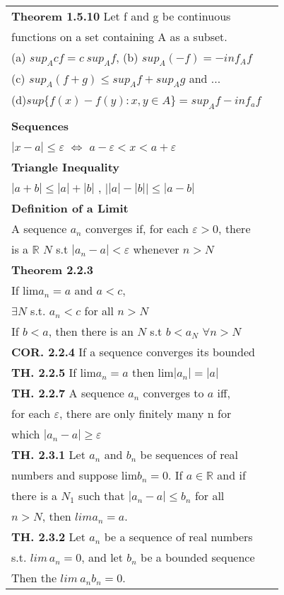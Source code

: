 \documentclass[10 pt,landscape]{article}
\begin{document}
\begin{multicols}{4}
\begin{tabular}{@{}ll@{}}
\textbf{Theorem 1.5.10} Let f and g be continuous\\ functions on a set containing A as a subset.\\
(a) $sup_A cf = c\:sup_A f$, 
(b) $sup_A(-f)=-inf_Af$\\
(c) $sup_A(f+g)\leq sup_Af + sup_Ag$ and ...\\
(d)$sup\{f(x)-f(y):x,y\in A\} = sup_Af-inf_af$
\\
\\
\textbf{Sequences}\\
$|x-a| \le \varepsilon$ $\iff$ $a-\varepsilon <x<a+ \varepsilon$\\
\textbf{Triangle Inequality}\\
$|a+b|\leq |a|+|b|$ , $\lvert |a|-|b|\rvert \leq |a-b|$\\
\textbf{Definition of a Limit}\\
A sequence $a_n$ converges if, for each  $\varepsilon >0$, there \\ is a $\mathbb{R}$ $N$ s.t 
$|a_n-a|<\varepsilon $ whenever $n>N$\\
\textbf{Theorem 2.2.3} \\
If lim\:$a_n =a$ and $a<c,$ \\ $\exists N$ s.t. $a_n<c$ for all $n>N$\\
If $b<a$, then there is an $N$ s.t $b<a_N$ $\forall n>N$\\
\textbf{COR. 2.2.4} If a sequence converges its bounded\\
\textbf{TH. 2.2.5} If lim$a_n=a$ then lim$|a_n|=|a|$\\
\textbf{TH. 2.2.7} A sequence $a_n$ converges to $a$ iff,\\ for each $\varepsilon$, there are only finitely many n for\\ which $|a_n-a| \geq \varepsilon$\\
\textbf{TH. 2.3.1} Let $a_n$ and $b_n$ be sequences of real\\ numbers and suppose lim$b_n=0$. If $a \in \mathbb{R}$ and if \\ there is a $N_1$ such that $|a_n-a|\leq b_n$ for all\\ $n>N$,  then $lima_n=a.$\\
\textbf{TH. 2.3.2} Let $a_n$ be a sequence of real numbers\\ s.t. $lim\,a_n=0$, and let $b_n$ be a bounded sequence\\ Then the $lim\:a_nb_n=0.$\\

\end{tabular}



\end{multicols}
\end{document}
